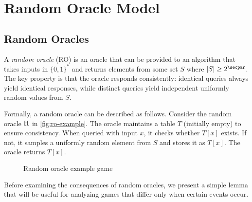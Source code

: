 \section{Random Oracle Model}\label{sec:rom}

\subsection{Random Oracles}

A \emph{random oracle} (RO) is an oracle that can be provided to an algorithm that takes inputs in $\{0, 1\}^*$ and returns elements from some set $S$ where $|S| \geq 2^\secpar$.
The key property is that the oracle responds consistently: identical queries always yield identical responses, while distinct queries yield independent uniformly random values from $S$.

Formally, a random oracle can be described as follows.
Consider the random oracle ${\normalfont\textsc{H}}$ in \autoref{fig:ro-example}.
The oracle maintains a table $T$ (initially empty) to ensure consistency.
When queried with input $x$, it checks whether $T[x]$ exists. If not, it samples a uniformly random element from $S$ and stores it as $T[x]$.
The oracle returns $T[x]$.


\begin{figure}[tbhp]
  \begin{center}
    \begin{tcolorbox}[width=8cm]
      \begin{pchstack}
        \pchspace
      \end{pchstack}
    \end{tcolorbox}
  \end{center}
  \caption{Random oracle example game\label{fig:ro-example}}
\end{figure}

Before examining the consequences of random oracles, we present a simple lemma that will be useful for analyzing games that differ only when certain events occur.

